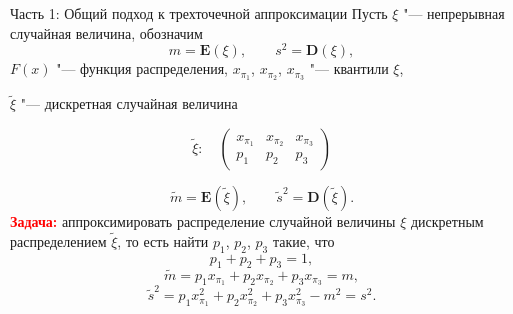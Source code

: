 \documentclass[ucs, notheorems, handout]{beamer}
\begin{document}
	\begin{frame}{Часть 1: Общий подход к трехточечной аппроксимации}
		Пусть $\xi$ "--- непрерывная случайная величина, обозначим  \[m = \mathbf E(\xi), \quad\quad s^{2} = \mathbf D(\xi),\]  $F(x)$ "--- функция распределения,
		$x_{\pi_{1}}$, $x_{\pi_{2}}$, $x_{\pi_{3}}$ "--- квантили $\xi$,
		
		$\tilde{\xi}$ "--- дискретная случайная величина 
		
		\[\tilde{\xi}:\quad\begin{pmatrix} 
			x_{\pi_{1}}&x_{\pi_{2}}&x_{\pi_{3}}\\ 
			p_{1} &  p_{2}  & p_{3}
		\end{pmatrix}\]
		
		\[\tilde{m} = \mathbf E(\tilde{\xi}), \quad\quad \tilde{s}^{2} = \mathbf D(\tilde{\xi}).\]
		\textcolor{red}{\textbf{Задача:}} аппроксимировать распределение случайной величины $\xi$ дискретным распределением $\tilde{\xi}$, то есть найти $p_{1}$, $p_{2}$, $p_{3}$ такие, что 
		\begin{equation*}
			p_{1} + p_{2} + p_{3} = 1, \label{1}
		\end{equation*}
		\begin{equation*}
			\tilde{m} = p_{1}x_{\pi_{1}} + p_{2}x_{\pi_{2}} + p_{3}x_{\pi_{3}} = m, \label{2}
		\end{equation*}
		\begin{equation*}
			\tilde{s}^{2} = p_{1} x_{\pi_{1}}^{2} + p_{2} x_{\pi_{2}}^{2} + p_{3} x_{\pi_{3}}^{2} - m^{2} = s^{2}. \label{3}
		\end{equation*}
		
	\end{frame}
	
\end{document}
